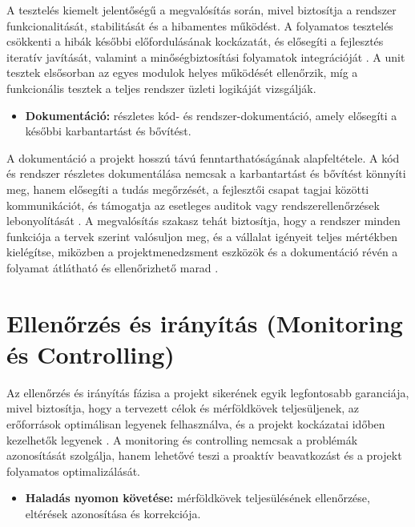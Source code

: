 A tesztelés kiemelt jelentőségű a megvalósítás során, mivel biztosítja a rendszer funkcionalitását, stabilitását 
és a hibamentes működést. A folyamatos tesztelés csökkenti a hibák későbbi 
előfordulásának kockázatát, és elősegíti a fejlesztés iteratív javítását, valamint 
a minőségbiztosítási folyamatok integrációját \cite{Szalay2018,Hajdu2014}. 
A unit tesztek elsősorban az egyes modulok helyes működését ellenőrzik, míg a funkcionális tesztek a teljes rendszer üzleti logikáját vizsgálják.

\begin{itemize}
    \item \textbf{Dokumentáció:} részletes kód- és rendszer-dokumentáció, amely elősegíti a későbbi karbantartást és bővítést.
\end{itemize}

A dokumentáció a projekt hosszú távú fenntarthatóságának alapfeltétele. A kód és 
rendszer részletes dokumentálása nemcsak a karbantartást és bővítést könnyíti meg, hanem elősegíti a tudás megőrzését, 
a fejlesztői csapat tagjai közötti kommunikációt, és támogatja az esetleges auditok vagy rendszerellenőrzések lebonyolítását \cite{Kovacs2016,Kaposi2019,Szalay2018}.
A megvalósítás szakasz tehát biztosítja, hogy a rendszer minden funkciója a tervek szerint valósuljon meg, és a vállalat 
igényeit teljes mértékben kielégítse, miközben a projektmenedzsment eszközök és a dokumentáció révén a folyamat átlátható és ellenőrizhető marad \cite{Hajdu2014}.


\section{Ellenőrzés és irányítás (Monitoring és Controlling)}

Az ellenőrzés és irányítás fázisa a projekt sikerének egyik legfontosabb garanciája, mivel biztosítja, 
hogy a tervezett célok és mérföldkövek teljesüljenek, az erőforrások optimálisan legyenek felhasználva, 
és a projekt kockázatai időben kezelhetők legyenek \cite{Hajdu2014,Szalay2018,Kovacs2016,Kaposi2019}. 
A monitoring és controlling nemcsak a problémák azonosítását 
szolgálja, hanem lehetővé teszi a proaktív beavatkozást és a projekt folyamatos optimalizálását.

\begin{itemize}
    \item \textbf{Haladás nyomon követése:} mérföldkövek teljesülésének ellenőrzése, eltérések azonosítása és korrekciója.
\end{itemize}


